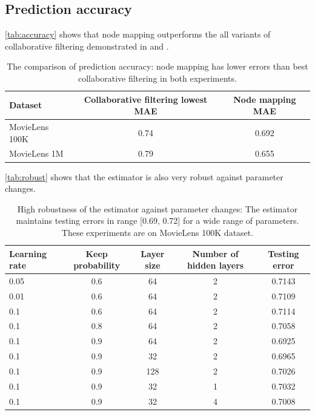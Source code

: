 \documentclass{article}
\begin{document}
\subsection{Prediction accuracy}

\autoref{tab:accuracy} shows that node mapping outperforms the all variants of 
collaborative filtering demonstrated in \cite{hwang2016efficient} and  
\cite{polatidis2016multi}.
\begin{table}[h]
	\centering
	\caption{The comparison of prediction accuracy: node mapping has lower 
	errors than best collaborative filtering in both experiments.}
	\begin{tabularx}{\textwidth}{ |X|c|c| }  \hline
		\textbf{Dataset} & \textbf{Collaborative filtering lowest MAE} & 
		\textbf{Node 
		mapping MAE} \\ \hline
		MovieLens 100K & 0.74 & 0.692 \\ \hline
		MovieLens 1M & 0.79 & 0.655 \\ \hline
	\end{tabularx}
	\label{tab:accuracy}
\end{table}
\autoref{tab:robust} shows that the estimator is also very robust against 
parameter changes.
\begin{table}[h]
	\centering
	\caption{High robustness of the estimator against parameter changes: 
		The estimator maintains testing errors in range [0.69, 0.72] for a wide 
		range of parameters. These experiments are on MovieLens 100K dataset.}
	\begin{tabularx}{\textwidth}{ |X|c|c|c|c| }  \hline
		 \textbf{Learning rate} & \textbf{Keep probability} & \textbf{Layer 
		 size} & \textbf{Number of hidden layers} & \textbf{Testing error} \\ 
		 \hline
		 0.05 & 0.6 & 64 & 2 & 0.7143 \\ \hline
		 0.01 & 0.6 & 64 & 2 & 0.7109 \\ \hline
		 0.1 & 0.6 & 64 & 2 & 0.7114 \\ \hline
		 0.1 & 0.8 & 64 & 2 & 0.7058 \\ \hline
		 0.1 & 0.9 & 64 & 2 & 0.6925 \\ \hline
		 0.1 & 0.9 & 32 & 2 & 0.6965 \\ \hline
		 0.1 & 0.9 & 128 & 2 & 0.7026 \\ \hline
		 0.1 & 0.9 & 32 & 1 & 0.7032 \\ \hline
		 0.1 & 0.9 & 32 & 4 & 0.7008 \\ \hline
	\end{tabularx}
	\label{tab:robust}
\end{table}
\end{document}
